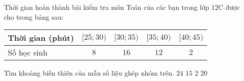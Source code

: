 \begin{ex}%
	Thời gian hoàn thành bài kiểm tra môn Toán của các bạn trong lớp $12$C được cho trong bảng sau:
	\begin{center}
		\begin{tabular}{|l|c|c|c|c|}
			\hline
			Thời gian (phút) & $[25;30 )$ & $[30;35)$ &$[35;40 )$ & $[40;45)$ \\
			\hline
			Số học sinh & $8$ & $16$ & $12$ & $2$ \\
			\hline
		\end{tabular}
	\end{center}
	Tìm khoảng biến thiên của mẫu số liệu ghép nhóm trên.
	\choice
	{$24$}
	{$15$}
	{$2$}
	{\True $20$}
\end{ex}

